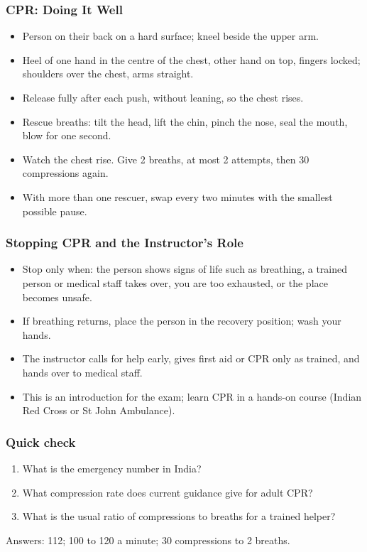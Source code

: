 \begin{frame}[fragile]\frametitle{CPR: Doing It Well}
    \begin{itemize}
        \item Person on their back on a hard surface; kneel beside the upper arm.
        \item Heel of one hand in the centre of the chest, other hand on top, fingers locked; shoulders over the chest, arms straight.
        \item Release fully after each push, without leaning, so the chest rises.
        \item Rescue breaths: tilt the head, lift the chin, pinch the nose, seal the mouth, blow for one second.
        \item Watch the chest rise. Give 2 breaths, at most 2 attempts, then 30 compressions again.
        \item With more than one rescuer, swap every two minutes with the smallest possible pause.
    \end{itemize}
\end{frame}

\begin{frame}[fragile]\frametitle{Stopping CPR and the Instructor's Role}
    \begin{itemize}
        \item Stop only when: the person shows signs of life such as breathing, a trained person or medical staff takes over, you are too exhausted, or the place becomes unsafe.
        \item If breathing returns, place the person in the recovery position; wash your hands.
        \item The instructor calls for help early, gives first aid or CPR only as trained, and hands over to medical staff.
        \item This is an introduction for the exam; learn CPR in a hands-on course (Indian Red Cross or St John Ambulance).
    \end{itemize}
\end{frame}

\begin{frame}[fragile]\frametitle{Quick check}
    \begin{enumerate}
        \item What is the emergency number in India?
        \item What compression rate does current guidance give for adult CPR?
        \item What is the usual ratio of compressions to breaths for a trained helper?
    \end{enumerate}
    {\small Answers: 112; 100 to 120 a minute; 30 compressions to 2 breaths.}
\end{frame}

